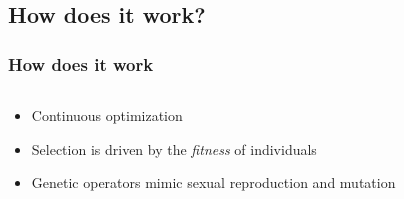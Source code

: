 \documentclass{beamer}
\begin{document}
\subsection[Evolutionary Computation]{How does it work?}

\begin{frame}
	\frametitle{How does it work}
\begin{columns}[T]
\begin{column}{0.6\textwidth}
\begin{itemize}
	\item Continuous optimization \\
	\item Selection is driven by the \textit{fitness} of individuals
	\item Genetic operators mimic sexual reproduction and mutation
	

\end{itemize}
\end{column}
\end{columns}
\end{frame}
\end{document}
